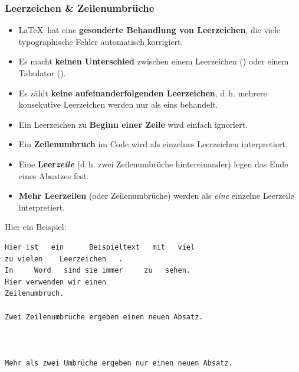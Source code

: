 \begin{frame}
\frametitle{Leerzeichen \& Zeilenumbrüche}

\begin{itemize}
\item \LaTeX\ hat eine \textbf{gesonderte Behandlung von Leerzeichen}, die viele typographische Fehler automatisch korrigiert.

\item Es macht \textbf{keinen Unterschied} zwischen einem Leerzeichen () oder einem Tabulator ().

\item Es zählt \textbf{keine aufeinanderfolgenden Leerzeichen}, d.\,h. mehrere konsekutive Leerzeichen werden nur als eins behandelt.

\item Ein Leerzeichen zu \textbf{Beginn einer Zeile} wird einfach ignoriert.

\item Ein \textbf{Zeilenumbruch} im Code wird als einzelnes Leerzeichen interpretiert.

\item Eine \textbf{Leer\emph{zeile}} (d.\,h. zwei Zeilenumbrüche hintereinander) legen das Ende eines Absatzes fest.

\item \textbf{Mehr Leerzeilen} (oder Zeilenumbrüche) werden als \emph{eine} einzelne Leerzeile interpretiert.

\end{itemize}

\end{frame}


\begin{frame}[fragile]

Hier ein Beispiel:

\begin{lstlisting}
Hier ist   ein      Beispieltext   mit   viel
zu vielen    Leerzeichen   .
In     Word   sind sie immer     zu   sehen.
Hier verwenden wir einen  
Zeilenumbruch.

Zwei Zeilenumbrüche ergeben einen neuen Absatz.



Mehr als zwei Umbrüche ergeben nur einen neuen Absatz.
\end{lstlisting}


\end{frame}


